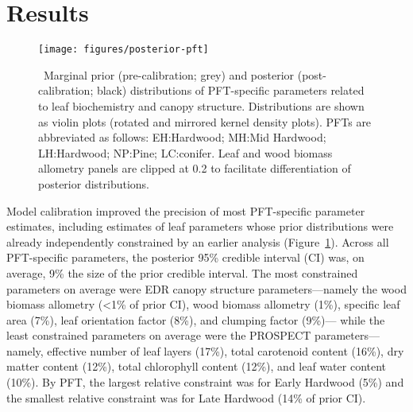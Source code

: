 \section{Results}

\begin{figure}
  \centering
  \texttt{[image: figures/posterior-pft]}
  \caption{\label{fig:posterior-pft}\
    Marginal prior (pre-calibration; grey) and posterior (post-calibration; black) distributions of PFT-specific parameters
    related to leaf biochemistry and canopy structure.
    Distributions are shown as violin plots (rotated and mirrored kernel density plots).
    PFTs are abbreviated as follows:
    EH:\@Early Hardwood;
    MH:\@North Mid Hardwood;
    LH:\@Late Hardwood;
    NP:\@Northern Pine;
    LC:\@Late conifer.
    Leaf and wood biomass allometry panels are clipped at 0.2 to facilitate differentiation of posterior distributions.
  }
\end{figure}

Model calibration improved the precision of most PFT-specific parameter estimates, including estimates of leaf parameters whose prior distributions were already independently constrained by an earlier analysis (Figure~\ref{fig:posterior-pft}).
Across all PFT-specific parameters, the posterior 95\% credible interval (CI) was, on average, 9\% the size of the prior credible interval.
The most constrained parameters on average were EDR canopy structure parameters---namely the wood biomass allometry (<1\% of prior CI), wood biomass allometry (1\%), specific leaf area (7\%), leaf orientation factor (8\%), and clumping factor (9\%)---
while the least constrained parameters on average were the PROSPECT parameters---namely, effective number of leaf layers (17\%), total carotenoid content (16\%), dry matter content (12\%), total chlorophyll content (12\%), and leaf water content (10\%).
By PFT, the largest relative constraint was for Early Hardwood (5\%) and the smallest relative constraint was for Late Hardwood (14\% of prior CI).

